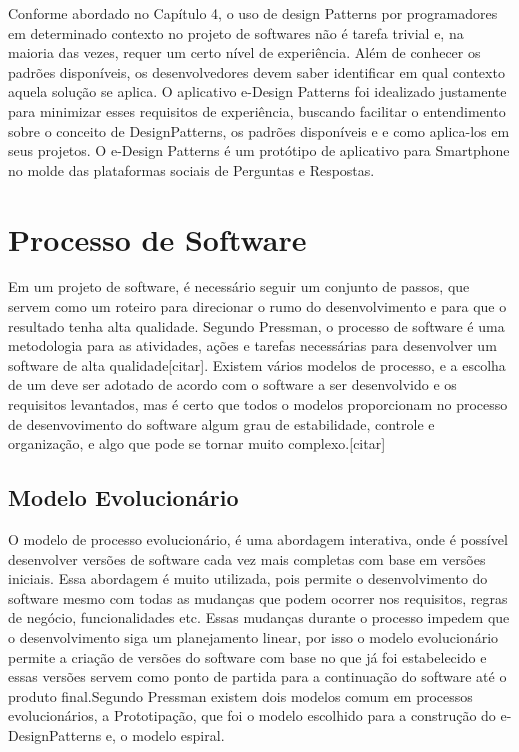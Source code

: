 Conforme abordado no Capítulo 4, o uso de design Patterns por programadores em determinado contexto no projeto de softwares não é tarefa trivial e, na maioria das vezes, requer um certo nível de experiência. Além de conhecer os padrões disponíveis, os desenvolvedores devem saber identificar em qual contexto aquela solução se aplica. O aplicativo e-Design Patterns foi idealizado justamente para minimizar esses requisitos de experiência, buscando facilitar o entendimento sobre o conceito de DesignPatterns, os padrões disponíveis e e como aplica-los em seus projetos. O e-Design Patterns é um protótipo de aplicativo para Smartphone no molde das plataformas sociais de Perguntas e Respostas.

\section{Processo de Software}

Em um projeto de software, é necessário seguir um conjunto de passos, que servem como um roteiro para direcionar o rumo do desenvolvimento e para que o resultado tenha alta qualidade. Segundo Pressman, o processo de software é uma metodologia para as atividades, ações e tarefas necessárias para desenvolver um software de alta qualidade[citar]. Existem vários modelos de processo, e a escolha de um deve ser adotado de acordo com o software a ser desenvolvido e os requisitos levantados, mas é certo que todos o modelos proporcionam no processo de desenvovimento do software algum grau de estabilidade, controle e organização, e algo que pode se tornar muito complexo.[citar]

\subsection{Modelo Evolucionário}

O modelo de processo evolucionário, é uma abordagem interativa, onde é possível desenvolver versões de software cada vez mais completas com base em versões iniciais. Essa abordagem é muito utilizada, pois permite o desenvolvimento do software  mesmo com todas as mudanças que podem ocorrer nos requisitos, regras de negócio, funcionalidades etc. Essas mudanças durante o processo impedem que o desenvolvimento siga um planejamento linear, por isso o modelo evolucionário permite a criação de versões do software com base no que já foi estabelecido e essas versões servem como ponto de partida para a continuação do software até o produto final.Segundo Pressman existem dois modelos comum em processos evolucionários, a Prototipação, que foi o modelo escolhido para a construção do e-DesignPatterns e, o modelo espiral. 


